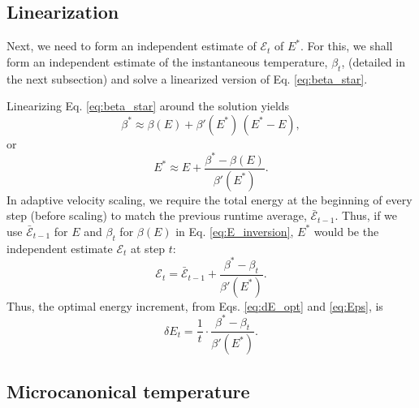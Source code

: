 \documentclass[reprint]{revtex4-1}
\begin{document}
\subsection{Linearization}



Next, we need to form an independent estimate of
$\mathcal E_t$ of $E^*$.
%
For this, we shall form
an independent estimate of
the instantaneous temperature, $\beta_t$,
(detailed in the next subsection)
and solve a linearized version of Eq. \eqref{eq:beta_star}.

Linearizing Eq. \eqref{eq:beta_star} around the solution
yields
%
\begin{equation*}
\beta^*
\approx
\beta( E )
+
\beta'( E^* ) \, ( E^* - E )
,
\end{equation*}
%
or
%
\begin{equation}
E^*
\approx
E
+
\frac{ \beta^* - \beta(E) }
     { \beta'(E^*) }
.
\label{eq:E_inversion}
\end{equation}
%
In adaptive velocity scaling,
we require the total energy at the beginning of every step
(before scaling) to match the previous runtime average,
$\bar{\mathcal E}_{t - 1}$.
%
Thus, if we use $\bar{\mathcal E}_{t - 1}$ for $E$
and $\beta_t$ for $\beta(E)$
in Eq. \eqref{eq:E_inversion},
$E^*$ would be the independent estimate
$\mathcal E_{t}$ at step $t$:
%
%
\begin{equation}
\mathcal E_t
=
\bar{\mathcal E}_{t - 1}
+
\frac{ \beta^* - \beta_t }
     { \beta'(E^*) }
.
\label{eq:Eps}
\end{equation}
%
Thus, the optimal energy increment,
from Eqs. \eqref{eq:dE_opt} and \eqref{eq:Eps},
is
%
\begin{equation}
\delta E_t
=
\frac{ 1 } { t }
\cdot
\frac{ \beta^* - \beta_t }
     { \beta'(E^*) }
.
\label{eq:dE_beta}
\end{equation}
%



\subsection{Microcanonical temperature}
\end{document}
